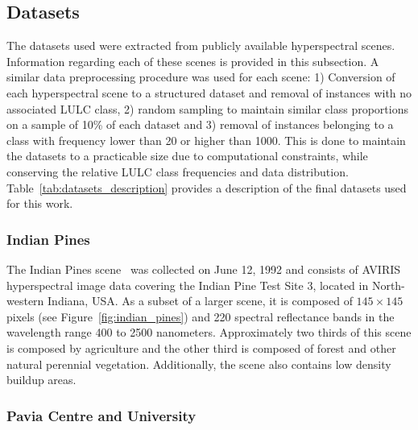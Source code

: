 \documentclass[parskip=full]{scrartcl}
\begin{document}
\subsection{Datasets}

The datasets used were extracted from publicly available hyperspectral scenes. Information regarding
each of these scenes is provided in this subsection. A similar data preprocessing procedure was used
for each scene: 1) Conversion of each hyperspectral scene to a structured dataset and removal of
instances with no associated LULC class, 2) random sampling to maintain similar class proportions on
a sample of 10\% of each dataset and 3) removal of instances belonging to a class with frequency
lower than 20 or higher than 1000. This is done to maintain the datasets to a practicable size due
to computational constraints, while conserving the relative LULC class frequencies and data
distribution. Table~\ref{tab:datasets_description} provides a description of the final datasets used
for this work.


\subsubsection*{Indian Pines} 

The Indian Pines scene~\cite{Baumgardner2015} was collected on June 12, 1992 and consists of AVIRIS
hyperspectral image data covering the Indian Pine Test Site 3, located in North-western Indiana,
USA. As a subset of a larger scene, it is composed of $145 \times 145$ pixels (see
Figure~\ref{fig:indian_pines}) and 220 spectral reflectance bands in the wavelength range 400 to
2500 nanometers. Approximately two thirds of this scene is composed by agriculture and the other
third is composed of forest and other natural perennial vegetation. Additionally, the scene also
contains low density buildup areas.

\subsubsection*{Pavia Centre and University}
\end{document}
